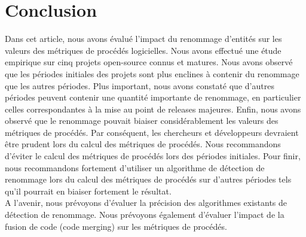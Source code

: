 \section{Conclusion}
\label{sec:conclusion}

Dans cet article, nous avons évalué l'impact du renommage d'entités sur les valeurs des métriques de procédés logicielles. Nous avons effectué une étude empirique sur cinq projets open-source connus et matures. Nous avons observé que les périodes initiales des projets sont plus enclines à contenir du renommage que les autres périodes. Plus important, nous avons constaté que d'autres périodes peuvent contenir une quantité importante de renommage, en particulier celles correspondantes à la mise au point de releases majeures. Enfin, nous avons observé que le renommage pouvait biaiser considérablement les valeurs des métriques de procédés. Par conséquent, les chercheurs et développeurs devraient être prudent lors du calcul des métriques de procédés. Nous recommandons d'éviter le calcul des métriques de procédés lors des périodes initiales. Pour finir, nous recommandons fortement d'utiliser un algorithme de détection de renommage lors du calcul des métriques de procédés sur d'autres périodes tels qu'il pourrait en biaiser fortement le résultat.\\

A l'avenir, nous prévoyons d'évaluer la précision des algorithmes existants de détection de renommage. Nous prévoyons également d'évaluer l'impact de la fusion de code (code merging) sur les métriques de procédés.
